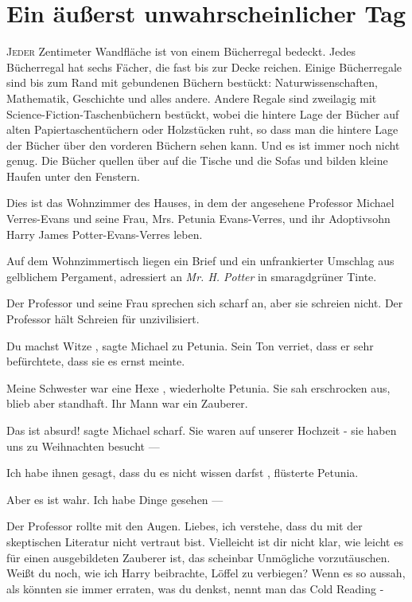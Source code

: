 \chapter{Ein äußerst unwahrscheinlicher Tag}

\lettrine{J}{eder} Zentimeter Wandfläche ist von einem Bücherregal bedeckt.
Jedes Bücherregal hat sechs Fächer, die fast bis zur Decke reichen. Einige
Bücherregale sind bis zum Rand mit gebundenen Büchern bestückt:
Naturwissenschaften, Mathematik, Geschichte und alles andere. Andere Regale sind
zweilagig mit Science-Fiction-Taschenbüchern bestückt, wobei die hintere Lage
der Bücher auf alten Papiertaschentüchern oder Holzstücken ruht, so dass man die
hintere Lage der Bücher über den vorderen Büchern sehen kann. Und es ist immer
noch nicht genug. Die Bücher quellen über auf die Tische und die Sofas und
bilden kleine Haufen unter den Fenstern.

Dies ist das Wohnzimmer des Hauses, in dem der angesehene Professor Michael
Verres-Evans und seine Frau, Mrs. Petunia Evans-Verres, und ihr Adoptivsohn
Harry James Potter-Evans-Verres leben.

Auf dem Wohnzimmertisch liegen ein Brief und ein unfrankierter Umschlag aus
gelblichem Pergament, adressiert an \emph{Mr. H. Potter} in smaragdgrüner Tinte.

Der Professor und seine Frau sprechen sich scharf an, aber sie schreien nicht.
Der Professor hält Schreien für unzivilisiert.

\glqq Du machst Witze\grqq{} , sagte Michael zu Petunia. Sein Ton verriet, dass er sehr
befürchtete, dass sie es ernst meinte.

\glqq Meine Schwester war eine Hexe\grqq{} , wiederholte Petunia. Sie sah erschrocken aus,
blieb aber standhaft. \glqq Ihr Mann war ein Zauberer.\grqq{}

\glqq Das ist absurd!\grqq{} sagte Michael scharf. \glqq Sie waren auf unserer Hochzeit - sie
haben uns zu Weihnachten besucht ---\grqq{}

\glqq Ich habe ihnen gesagt, dass du es nicht wissen darfst\grqq{} , flüsterte Petunia.

\glqq Aber es ist wahr. Ich habe Dinge gesehen ---\grqq{}

Der Professor rollte mit den Augen. \glqq Liebes, ich verstehe, dass du mit der
skeptischen Literatur nicht vertraut bist. Vielleicht ist dir nicht klar, wie
leicht es für einen ausgebildeten Zauberer ist, das scheinbar Unmögliche
vorzutäuschen. Weißt du noch, wie ich Harry beibrachte, Löffel zu verbiegen?
Wenn es so aussah, als könnten sie immer erraten, was du denkst, nennt man das
Cold Reading -\grqq{}

